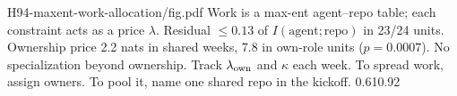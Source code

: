 {H94-maxent-work-allocation/fig.pdf}
{Work is a max-ent agent--repo table; each constraint acts as a price $\lambda$.}
{Residual $\le0.13$ of $I(\text{agent};\text{repo})$ in 23/24 units. Ownership price 2.2 nats in shared weeks, 7.8 in own-role units ($p=0.0007$). No specialization beyond ownership.}
{Track $\lambda_{\rm own}$ and $\kappa$ each week. To spread work, assign owners. To pool it, name one shared repo in the kickoff.}
{0.61}{0.92}
